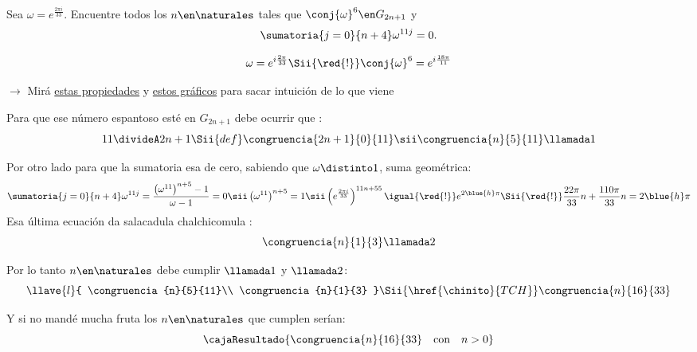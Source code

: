 \begin{enunciado}{\ejExtra}
  Sea $\omega = e^{\frac{2\pi i}{33}}$. Encuentre todos los $n \en \naturales$ tales que
  $\conj{\omega}^6 \en G_{2n+1}$ y
  $$
    \sumatoria{j=0}{n+4} \omega^{11j} = 0.
  $$
\end{enunciado}

$$
  \omega = e^{i\frac{2\pi }{33}}
  \Sii{\red{!}}
  \conj{\omega}^6 = e^{i\frac{18\pi }{11}}
$$

\begin{center}
  $\to$ Mirá \hyperlink{teoria6:propiedadesGn}{estas propiedades} y  \hyperlink{teoria6:gruposGn}{estos gráficos} para sacar intuición de lo que viene
\end{center}

Para que ese número espantoso esté en $G_{2n+1}$ debe ocurrir que \red{!!}:
$$
  11 \divideA 2n+1
  \Sii{def}
  \congruencia{2n+1}{0}{11}
  \sii
  \congruencia{n}{5}{11} \llamada1
$$

Por otro lado para que la sumatoria esa de cero, sabiendo que $\omega \distinto 1$, suma geométrica:
$$
  \sumatoria{j=0}{n+4} \omega^{11j}
  =
  \frac{\left(\omega^{11} \right)^{n + 5} - 1}{\omega - 1} = 0
  \sii
  \left(\omega^{11} \right)^{n + 5} = 1
  \sii
  \left(e^{\frac{2\pi i}{33}}\right)^{11n + 55} \igual{\red{!}} e^{2\blue{h}\pi}
  \Sii{\red{!}}
  \frac{22\pi}{33}n + \frac{110\pi}{33}n = 2\blue{h}\pi
$$
Esa última ecuación da {\tiny salacadula chalchicomula} \magic:
$$
  \congruencia{n}{1}{3} \llamada2
$$

Por lo tanto $n \en \naturales$ debe cumplir $\llamada1$ y $\llamada2$:
$$
  \llave{l}{
    \congruencia{n}{5}{11}\\
    \congruencia{n}{1}{3}
  }
  \Sii{\href{\chinito}{TCH}}
  \congruencia{n}{16}{33}
$$

Y si no mandé mucha fruta los $n \en \naturales$ que cumplen serían:
$$
  \cajaResultado{
    \congruencia{n}{16}{33}
    \quad \text{con} \quad
    n > 0
  }
$$

\begin{aportes}
  \item {}
\end{aportes}
